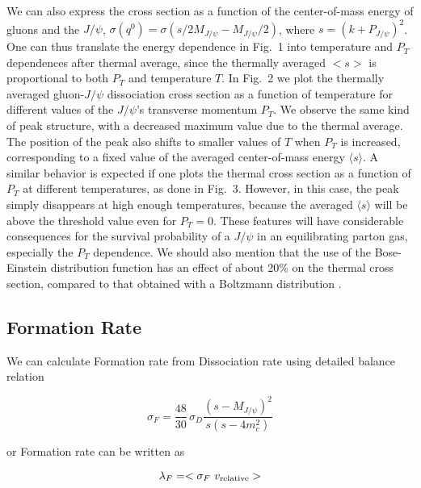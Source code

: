 \documentclass[aps,prc,preprint,superscriptaddress,showpacs,showkeys]{revtex4-1}
\begin{document}
We can also express the cross section as a function of the
center-of-mass energy of gluons and the $J/\psi$,
$\sigma(q^0)=\sigma(s/2M_{J/\psi}-M_{J/\psi}/2)$, where
$s=(k+P_{J/\psi})^2$. One can thus translate the energy
dependence in Fig.~1 into temperature and $P_T$ dependences
after thermal average, since the thermally averaged $<s>$
is proportional to both $P_T$ and temperature $T$.
In Fig.~2 we plot the thermally averaged gluon-$J/\psi$ dissociation
cross section as a function of temperature for
different values of the $J/\psi$'s transverse momentum $P_T$.
We observe the same kind of peak structure, with a decreased
maximum value due to the thermal average. The position of the
peak also shifts to smaller values of $T$ when $P_T$ is
increased, corresponding to a fixed value of the averaged
center-of-mass energy $\langle s\rangle$. A similar behavior is
expected if one plots the thermal
cross section as a function of $P_T$ at different temperatures, as done
in Fig.~3. However, in this case, the peak simply disappears
at high enough temperatures, because the averaged $\langle s\rangle$
will be above the threshold value even for $P_T=0$.
These features will have considerable consequences for
the survival probability of a $J/\psi$ in an equilibrating
parton gas, especially the $P_T$ dependence.
We should also mention that the use of the Bose-Einstein
distribution function has an effect of about 20\% on the
thermal cross section, compared to that
obtained with a Boltzmann distribution \cite{ks95}.






\subsection{Formation Rate}
We can calculate Formation rate from Dissociation rate using detailed balance relation

\begin{equation}
 \sigma_{F} = \frac{48}{30}\,\sigma_{D}\frac{(s-M_{J/\psi})^{2}}{s(s-4m_{c}^{2})}
\end{equation}

or Formation rate can be written as 

\begin{equation}
\lambda_{F} = <\sigma_{F} \,\, v_{\rm relative}>
\end{equation}
\end{document}
